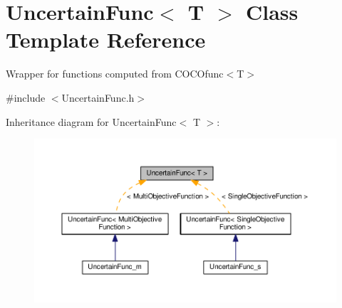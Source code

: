 \hypertarget{classUncertainFunc}{}\section{Uncertain\+Func$<$ T $>$ Class Template Reference}
\label{classUncertainFunc}


Wrapper for functions computed from C\+O\+C\+Ofunc$<$\+T$>$  




{\ttfamily \#include $<$Uncertain\+Func.\+h$>$}



Inheritance diagram for Uncertain\+Func$<$ T $>$\+:\nopagebreak
\begin{figure}[H]
\begin{center}
\leavevmode
\includegraphics[width=350pt]{classUncertainFunc__inherit__graph}
\end{center}
\end{figure}
